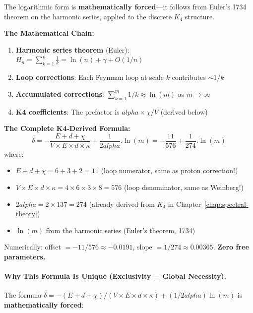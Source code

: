 \documentclass[11pt,a4paper]{book}
\def\alpha{alpha}%
\def\cdot{.}%
\begin{document}
The logarithmic form is \textbf{mathematically forced}---it follows from Euler's 1734 theorem 
on the harmonic series, applied to the discrete $K_4$ structure.

\textbf{The Mathematical Chain:}
\begin{enumerate}
\item \textbf{Harmonic series theorem} (Euler): $H_n = \sum_{k=1}^n \frac{1}{k} = \ln(n) + \gamma + O(1/n)$
\item \textbf{Loop corrections}: Each Feynman loop at scale $k$ contributes $\sim 1/k$
\item \textbf{Accumulated corrections}: $\sum_{k=1}^m 1/k \approx \ln(m)$ as $m \to \infty$
\item \textbf{K4 coefficients}: The prefactor is $\alpha \times \chi/V$ (derived below)
\end{enumerate}

\textbf{The Complete K4-Derived Formula:}
\[
\delta = -\frac{E + d + \chi}{V \times E \times d \times \kappa} + \frac{1}{2\alpha} \cdot \ln(m) = -\frac{11}{576} + \frac{1}{274} \cdot \ln(m)
\]
where:
\begin{itemize}
\item $E + d + \chi = 6 + 3 + 2 = 11$ (loop numerator, same as proton correction!)
\item $V \times E \times d \times \kappa = 4 \times 6 \times 3 \times 8 = 576$ (loop denominator, same as Weinberg!)
\item $2\alpha = 2 \times 137 = 274$ (already derived from $K_4$ in Chapter~\ref{chap:spectral-theory})
\item $\ln(m)$ from the harmonic series (Euler's theorem, 1734)
\end{itemize}

Numerically: offset $= -11/576 \approx -0.0191$, slope $= 1/274 \approx 0.00365$. \textbf{Zero free parameters.}

\paragraph{Why This Formula Is Unique (Exclusivity = Global Necessity).}

The formula $\delta = -(E + d + \chi)/(V \times E \times d \times \kappa) + (1/2\alpha)\ln(m)$ is \textbf{mathematically forced}:
\end{document}
